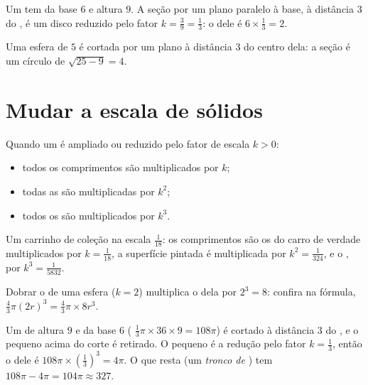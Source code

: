 \begin{example}\label{ex:g9:solids:section}
Um  tem  da base $6$ e altura $9$. A seção por um plano
paralelo à base, à distância $3$ do , é um disco reduzido pelo
fator $k = \frac39 = \frac13$: o  dele é $6 \times \frac13 = 2$.

Uma esfera de  $5$ é cortada por um plano à distância $3$ do centro
dela: a seção é um círculo de  $\sqrt{25 - 9} = 4$.
\end{example}

\section{Mudar a escala de sólidos}

\begin{theorem}\label{thm:g9:solids:scaling}
Quando um  é ampliado ou reduzido pelo fator de escala $k > 0$:
\begin{itemize}
  \item todos os comprimentos são multiplicados por $k$;
  \item todas as  são multiplicadas por $k^2$;
  \item todos os  são multiplicados por $k^3$.
\end{itemize}
\end{theorem}
\admitted

\begin{example}\label{ex:g9:solids:scaling}
Um carrinho de coleção na escala $\frac{1}{18}$: os comprimentos são os
do carro de verdade multiplicados por $k = \frac{1}{18}$, a superfície
pintada é multiplicada por $k^2 = \frac{1}{324}$, e o , por
$k^3 = \frac{1}{5832}$.

Dobrar o  de uma esfera ($k = 2$) multiplica o  dela por
$2^3 = 8$: confira na fórmula,
$\frac43\pi (2r)^3 = \frac43 \pi \times 8r^3$.
\end{example}

\begin{example}\label{ex:g9:solids:truncated}
Um  de altura $9$ e  da base $6$ (
$\frac13 \pi \times 36 \times 9 = 108\pi$) é cortado à distância $3$ do
, e o  pequeno acima do corte é retirado. O  pequeno é a
redução pelo fator $k = \frac13$, então o  dele é
$108\pi \times \left(\frac13\right)^3 = 4\pi$. O  que resta (um
\emph{tronco de }) tem 
$108\pi - 4\pi = 104\pi \approx 327$.
\end{example}

